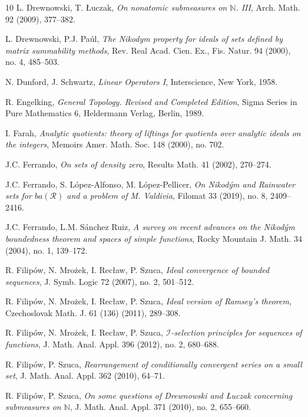 \documentclass[a4paper,11pt,fleqn]{amsart}
\theoremstyle{definition}
\theoremstyle{remark}
\numberwithin{equation}{section}
\newcommand{\N}{\mathbb{N}}
\begin{document}
\begin{thebibliography}{10}
 L. Drewnowski, T. \L uczak, \textit{On nonatomic submeasures on $\N$. III}, Arch. Math. 92 (2009), 377--382.

 L. Drewnowski, P.J. Pa\'ul, \textit{The Nikodym property for ideals of sets defined by matrix summability methods}, Rev. Real Acad. Cien. Ex., Fis. Natur. 94 (2000), no. 4, 485--503.

 N. Dunford, J. Schwartz, \textit{Linear Operators I}, Interscience, New York, 1958.

 R. Engelking, \textit{General Topology. Revised and Completed Edition}, Sigma Series in Pure Mathematics 6, Heldermann Verlag, Berlin, 1989.

 I. Farah, \textit{Analytic quotients: theory of liftings for quotients over analytic ideals on the integers}, Memoirs Amer. Math. Soc. 148 (2000), no. 702.

 J.C. Ferrando, \textit{On sets of density zero}, Results Math. 41 (2002), 270--274.

 J.C. Ferrando, S. L\'opez-Alfonso, M. L\'opez-Pellicer, \textit{On Nikod\'ym and Rainwater sets for $ba(\mathcal{R})$ and a problem of M. Valdivia}, Filomat 33 (2019), no. 8, 2409--2416.

 J.C. Ferrando, L.M. S\'anchez Ruiz, \textit{A survey on recent advances on the Nikod\'ym boundedness theorem and spaces of simple functions}, Rocky Mountain J. Math. 34 (2004), no. 1, 139--172.

 R. Filip\'{o}w, N. Mro\.{z}ek, I. Rec\l aw, P. Szuca, \textit{Ideal convergence of bounded sequences}, J. Symb. Logic 72 (2007), no. 2, 501--512.

 R. Filip\'{o}w, N. Mro\.{z}ek, I. Rec\l aw, P. Szuca, \textit{Ideal version of Ramsey's theorem}, Czechoslovak Math. J. 61 (136) (2011), 289--308.

 R. Filip\'{o}w, N. Mro\.{z}ek, I. Rec\l aw, P. Szuca, \textit{$\mathcal{I}$-selection principles for sequences of functions}, J. Math. Anal. Appl. 396 (2012), no. 2, 680--688.

 R. Filip\'{o}w, P. Szuca, \textit{Rearrangement of conditionally convergent series on a small set}, J. Math. Anal. Appl. 362 (2010), 64--71.

 R. Filip\'{o}w, P. Szuca, \textit{On some questions of Drewnowski and \L uczak concerning submeasures on $\N$}, J. Math. Anal. Appl. 371 (2010), no. 2, 655--660.


\end{thebibliography}
\end{document}
